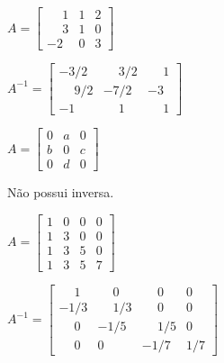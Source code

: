 \documentclass[12pt]{exam}
\begin{document}
\begin{exercicio}
      $
    A =\begin{bmatrix}
        \phantom{-} 1 & 1 & 2\\
        \phantom{-} 3 & 1 & 0\\
        -2 & 0 & 3
    \end{bmatrix}
    $
    \begin{solucao}
        $
        A^{-1} =\begin{bmatrix}
            -3/2 & \phantom{-} 3/2 & \phantom{-} 1\\
            \phantom{-} 9/2 & -7/2 & -3\\
            -1 & \phantom{-} 1 & \phantom{-} 1
        \end{bmatrix}
        $
    \end{solucao}
\end{exercicio}

\begin{exercicio}
    $
    A = \begin{bmatrix}
        0 & a & 0\\
        b & 0 & c\\
        0 & d & 0
    \end{bmatrix}
    $
    \begin{solucao}
       Não possui inversa.
    \end{solucao}
\end{exercicio}

\begin{exercicio}
    $
        A = \begin{bmatrix}
            1 & 0 & 0 & 0\\
            1 & 3 & 0 & 0\\
            1 & 3 & 5 & 0\\
            1 & 3 & 5 & 7
        \end{bmatrix}
    $
    \begin{solucao}
        $
            A^{-1} = \begin{bmatrix}
                \phantom{-}1 & \phantom{-}0 & \phantom{-}0 & 0\\
                -1/3 & \phantom{-}1/3 & \phantom{-}0 & 0\\
                \phantom{-}0 & -1/5 & \phantom{-}1/5 & 0\\
                \phantom{-}0 & 0 & -1/7 & 1/7
            \end{bmatrix}
        $
    \end{solucao}
\end{exercicio}
\end{document}
